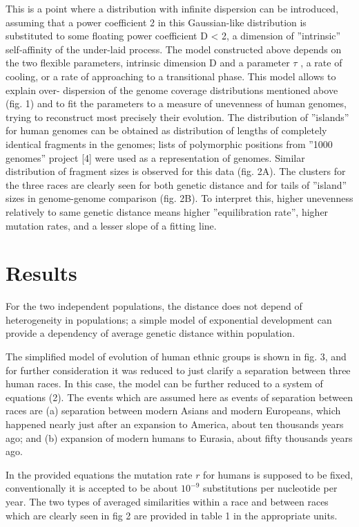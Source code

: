 \documentclass[a4paper]{article}
\begin{document}
This is a point where a distribution with infinite dispersion can be introduced, assuming that a power coefficient 2 in this Gaussian-like distribution is substituted
to some floating power coefficient D < 2, a dimension of ''intrinsic'' self-affinity of the under-laid process. The model constructed above depends on the two
flexible parameters, intrinsic dimension D and a parameter $\tau$ , a rate of cooling, or a rate of approaching to a transitional phase. This model allows to explain over-
dispersion of the genome coverage distributions mentioned above (fig. 1) and to fit the parameters to a measure of unevenness of human genomes, trying to
reconstruct most precisely their evolution. The distribution of ''islands'' for human genomes can be obtained as distribution of lengths of completely
identical fragments in the genomes; lists of polymorphic positions from ''1000 genomes'' project [4] were used as a representation of genomes. Similar distribution of
fragment sizes is observed for this data (fig. 2A). The clusters for the three races are clearly seen for both genetic distance and for tails of ''island'' sizes
in genome-genome comparison (fig. 2B). To interpret this, higher unevenness relatively to same genetic distance means higher ''equilibration rate'', higher mutation rates, and a lesser slope of a fitting line.

\section{Results}

For the two independent populations, the distance does not depend of heterogeneity in populations; a simple model of exponential development can provide a dependency of average genetic distance within population.


The simplified model of evolution of human ethnic groups is shown in fig. 3, and for further consideration it was reduced to just clarify a separation between three human races. In this case, the model can be further reduced to a system of equations (2). The events which are assumed here as events of separation between races are (a) separation between modern Asians and modern Europeans, which happened nearly just after an expansion to America, about ten thousands years ago; and (b) expansion of modern humans to Eurasia, about fifty thousands years ago.


In the provided equations the mutation rate $r$ for humans is supposed to be fixed, conventionally it is accepted to be about $10^{-9}$
substitutions per nucleotide per year. The two types of averaged similarities within a race and between races which are clearly seen in fig 2 are provided in table 1 in the appropriate units.
\end{document}
